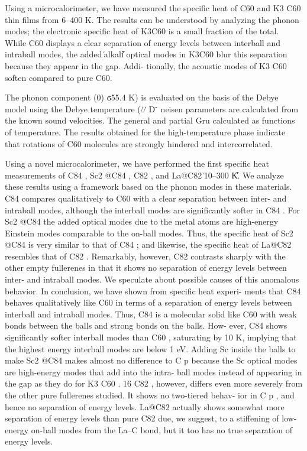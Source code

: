 \documentclass[aps,prb,onecolumn,preprint,superscriptaddress,footinbib,amsmath,amssymb,floatfix]{revtex4}
\begin{document}
Using a microcalorimeter, we have measured the specific heat of C60 
and K3 C60 thin films from 6–400 K.
The results can be understood by analyzing the phonon modes; the 
electronic specific heat of K3C60 is a small
fraction of the total. While C60 displays a clear separation of 
energy levels between interball and intraball
modes, the added ͑alkali͒ optical modes in K3C60 blur this separation 
because they appear in the gap. Addi-
tionally, the acoustic modes of K3 C60 soften compared to pure C60.
\cite{allen_specific_1999}

The phonon component
(0)
ϭ55.4 K)
is evaluated on the basis of the Debye model using the Debye temperature 
(⌰ D ̈ neisen parameters are
calculated from the known sound velocities. The general and partial Gru
calculated as functions of temperature. The results obtained for the 
high-temperature
phase indicate that rotations of C60 molecules are strongly hindered 
and intercorrelated.
\cite{aksenova_analysis_1999}

Using a novel microcalorimeter, we have performed the first specific heat 
measurements of C84 ,
Sc2 @C84 , C82 , and La@C82 ͑10–300 K͒. We analyze these results using a 
framework based on the
phonon modes in these materials. C84 compares qualitatively to C60 with a 
clear separation between
inter- and intraball modes, although the interball modes are significantly 
softer in C84 . For Sc2 @C84
the added optical modes due to the metal atoms are high-energy Einstein 
modes comparable to the
on-ball modes. Thus, the specific heat of Sc2 @C84 is very similar to that 
of C84 ; and likewise, the
specific heat of La@C82 resembles that of C82 . Remarkably, however, C82 
contrasts sharply with
the other empty fullerenes in that it shows no separation of energy levels 
between inter- and intraball
modes. We speculate about possible causes of this anomalous behavior.
In conclusion, we have shown from specific heat experi-
ments that C84 behaves qualitatively like C60 in terms of a
separation of energy levels between interball and intraball
modes. Thus, C84 is a molecular solid like C60 with weak
bonds between the balls and strong bonds on the balls. How-
ever, C84 shows significantly softer interball modes than C60 ,
saturating by 10 K, implying that the highest energy interball
modes are below 1 eV. Adding Sc inside the balls to make
Sc2 @C84 makes almost no difference to C p because the Sc
optical modes are high-energy modes that add into the intra-
ball modes instead of appearing in the gap as they do for
K3 C60 . 16 C82 , however, differs even more severely from the
other pure fullerenes studied. It shows no two-tiered behav-
ior in C p , and hence no separation of energy levels. La@C82
actually shows somewhat more separation of energy levels
than pure C82 due, we suggest, to a stiffening of low-energy
on-ball modes from the La–C bond, but it too has no true
separation of energy levels.
\cite{allen_specific_1999}
\end{document}
